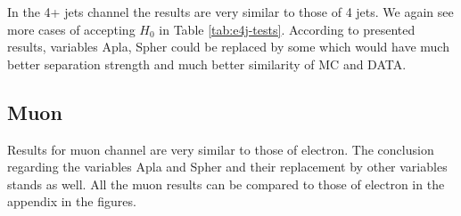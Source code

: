 In the 4+ jets channel the results are very similar to those of 4 jets. We again see more cases of accepting $H_0$ in Table \ref{tab:e4j-tests}. According to presented results, variables \textsf{Apla, Spher} could be replaced by some which would have much better separation strength and much better similarity of MC and DATA. 

\subsection{Muon}


Results for muon channel are very similar to those of electron. The conclusion regarding the variables \textsf{Apla} and \textsf{Spher} and their replacement by other variables stands as well. All the muon results can be compared to those of electron in the appendix in the figures.

